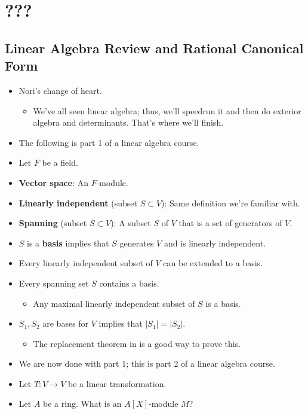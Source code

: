 \documentclass[../notes.tex]{subfiles}
\begin{document}
\chapter{???}
\section{Linear Algebra Review and Rational Canonical Form}
\begin{itemize}
    \item {}Nori's change of heart.
    \begin{itemize}
        \item We've all seen linear algebra; thus, we'll speedrun it and then do exterior algebra and determinants. That's where we'll finish.
    \end{itemize}
    \item The following is part 1 of a linear algebra course.
    \item Let $F$ be a field.
    \item \textbf{Vector space}: An $F$-module.
    \item \textbf{Linearly independent} (subset $S\subset V$): Same definition we're familiar with.
    \item \textbf{Spanning} (subset $S\subset V$): A subset $S$ of $V$ that is a set of generators of $V$.
    \item $S$ is a \textbf{basis} implies that $S$ generates $V$ and is linearly independent.
    \item Every linearly independent subset of $V$ can be extended to a basis.
    \item Every spanning set $S$ contains a basis.
    \begin{itemize}
        \item Any maximal linearly independent subset of $S$ is a basis.
    \end{itemize}
    \item $S_1,S_2$ are bases for $V$ implies that $|S_1|=|S_2|$.
    \begin{itemize}
        \item The replacement theorem in \textcite{bib:DummitFoote} is a good way to prove this.
    \end{itemize}
    \item We are now done with part 1; this is part 2 of a linear algebra course.
    \item Let $T:V\to V$ be a linear transformation.
    \item Let $A$ be a ring. What is an $A[X]$-module $M$?

\end{itemize}
\end{document}
